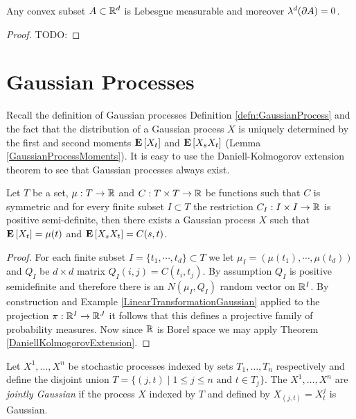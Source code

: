 \begin{prop}\label{LebesgueMeasurabilityOfConvexSets}Any convex subset  $A \subset \mathbb{R}^d$ is Lebesgue measurable and moreover $\lambda^d(\partial A) = 0$.
\end{prop}
\begin{proof}
TODO:
\end{proof}

\section{Gaussian Processes}

Recall the definition of Gaussian processes Definition \ref{defn:GaussianProcess} and the fact that the distribution of a Gaussian process $X$ is uniquely 
determined by the first and second moments $\textbf{E}\left[X_t\right]$ and $\textbf{E}\left[X_s X_t\right]$ (Lemma \ref{GaussianProcessMoments}).  It is easy to use 
the Daniell-Kolmogorov extension theorem to see that Gaussian processes always exist. 

\begin{prop}\label{ExistenceGaussianProcess}Let $T$ be a set, $\mu : T \to \mathbb{R}$ and $C : T \times T \to \mathbb{R}$ be functions such that $C$ is symmetric and for every finite subset $I \subset T$ the restriction $C_I : I \times I \to \mathbb{R}$ is positive semi-definite, then there exists a Gaussian process $X$ such that $\textbf{E}\left[X_t\right] = \mu(t)$ and $\textbf{E}\left[X_s X_t\right] = C(s,t)$.
\end{prop}
\begin{proof}
For each finite subset $I = \lbrace t_1, \cdots, t_d \rbrace \subset T$ we let $\mu_I = (\mu(t_1), \cdots, \mu(t_d))$ and $Q_I$ be $d \times d$ matrix $Q_I(i,j) = C(t_i,t_j)$.  By assumption $Q_I$ is positive semidefinite and therefore there is an $N(\mu_I, Q_I)$ random vector on $\mathbb{R}^I$.  By construction and Example \ref{LinearTransformationGaussian} applied to the projection $\pi : \mathbb{R}^I \to \mathbb{R}^J$ it follows that this defines a projective family of probability measures.  Now since $\mathbb{R}$ is Borel space we may apply Theorem \ref{DaniellKolmogorovExtension}.
\end{proof}

\begin{defn}\label{defn:JointlyGaussianProcesses}Let $X^1, \dotsc, X^n$ be stochastic processes indexed by sets  $T_1, \dotsc, T_n$ respectively and define the disjoint union $T=\lbrace (j,t) \mid 1 \leq j \leq n \text { and } t \in T_j \rbrace$. The $X^1, \dotsc, X^n$ are \emph{jointly Gaussian} if the process  $X$ indexed by $T$ and defined by $X_{(j,t)} = X^j_t$ is Gaussian.
\end{defn}


